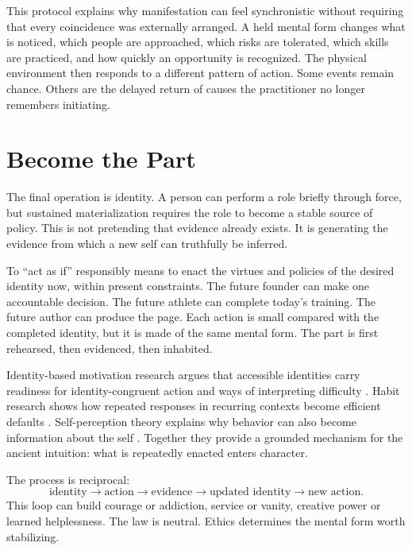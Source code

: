 \documentclass[11pt]{article}
\theoremstyle{plain}
\theoremstyle{definition}
\begin{document}
This protocol explains why manifestation can feel synchronistic without requiring
that every coincidence was externally arranged. A held mental form changes what is
noticed, which people are approached, which risks are tolerated, which skills are
practiced, and how quickly an opportunity is recognized. The physical environment then
responds to a different pattern of action. Some events remain chance. Others are the
delayed return of causes the practitioner no longer remembers initiating.

\section{Become the Part}

The final operation is identity. A person can perform a role briefly through force,
but sustained materialization requires the role to become a stable source of policy.
This is not pretending that evidence already exists. It is generating the evidence
from which a new self can truthfully be inferred.

To ``act as if'' responsibly means to enact the virtues and policies of the desired
identity now, within present constraints. The future founder can make one accountable
decision. The future athlete can complete today's training. The future author can
produce the page. Each action is small compared with the completed identity, but it is
made of the same mental form. The part is first rehearsed, then evidenced, then
inhabited.

Identity-based motivation research argues that accessible identities carry readiness
for identity-congruent action and ways of interpreting difficulty
\citep{oyserman2009identity}. Habit research shows how repeated responses in recurring
contexts become efficient defaults \citep{wood2016psychology}. Self-perception theory
explains why behavior can also become information about the self
\citep{bem1972selfperception}. Together they provide a grounded mechanism for the
ancient intuition: what is repeatedly enacted enters character.

The process is reciprocal:
\begin{equation}
\text{identity}\rightarrow\text{action}\rightarrow\text{evidence}
\rightarrow\text{updated identity}\rightarrow\text{new action}.
\label{eq:identity-loop}
\end{equation}
This loop can build courage or addiction, service or vanity, creative power or learned
helplessness. The law is neutral. Ethics determines the mental form worth stabilizing.
\end{document}
